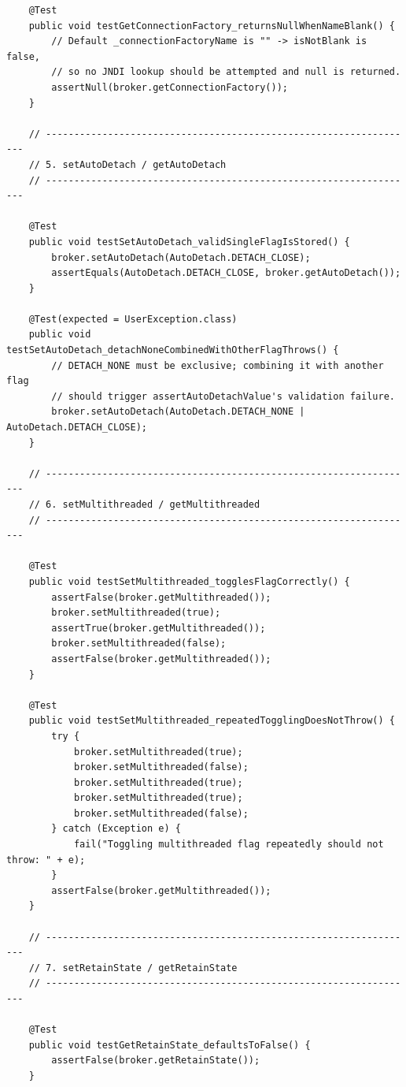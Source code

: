 \begin{lstlisting}
    @Test
    public void testGetConnectionFactory_returnsNullWhenNameBlank() {
        // Default _connectionFactoryName is "" -> isNotBlank is false,
        // so no JNDI lookup should be attempted and null is returned.
        assertNull(broker.getConnectionFactory());
    }

    // ------------------------------------------------------------------
    // 5. setAutoDetach / getAutoDetach
    // ------------------------------------------------------------------

    @Test
    public void testSetAutoDetach_validSingleFlagIsStored() {
        broker.setAutoDetach(AutoDetach.DETACH_CLOSE);
        assertEquals(AutoDetach.DETACH_CLOSE, broker.getAutoDetach());
    }

    @Test(expected = UserException.class)
    public void testSetAutoDetach_detachNoneCombinedWithOtherFlagThrows() {
        // DETACH_NONE must be exclusive; combining it with another flag
        // should trigger assertAutoDetachValue's validation failure.
        broker.setAutoDetach(AutoDetach.DETACH_NONE | AutoDetach.DETACH_CLOSE);
    }

    // ------------------------------------------------------------------
    // 6. setMultithreaded / getMultithreaded
    // ------------------------------------------------------------------

    @Test
    public void testSetMultithreaded_togglesFlagCorrectly() {
        assertFalse(broker.getMultithreaded());
        broker.setMultithreaded(true);
        assertTrue(broker.getMultithreaded());
        broker.setMultithreaded(false);
        assertFalse(broker.getMultithreaded());
    }

    @Test
    public void testSetMultithreaded_repeatedTogglingDoesNotThrow() {
        try {
            broker.setMultithreaded(true);
            broker.setMultithreaded(false);
            broker.setMultithreaded(true);
            broker.setMultithreaded(true);
            broker.setMultithreaded(false);
        } catch (Exception e) {
            fail("Toggling multithreaded flag repeatedly should not throw: " + e);
        }
        assertFalse(broker.getMultithreaded());
    }

    // ------------------------------------------------------------------
    // 7. setRetainState / getRetainState
    // ------------------------------------------------------------------

    @Test
    public void testGetRetainState_defaultsToFalse() {
        assertFalse(broker.getRetainState());
    }


\end{lstlisting}
